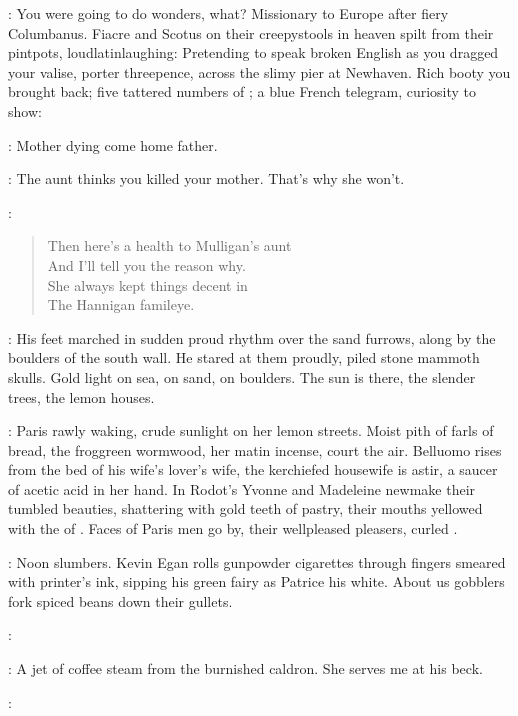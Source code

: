 \StephenInt:
You were going to do wonders, what?
Missionary to Europe after fiery Columbanus.
Fiacre and Scotus on their creepystools in heaven
spilt from their pintpots, loudlatinlaughing:
Pretending to speak broken English
as you dragged your valise, porter threepence,
across the slimy pier at Newhaven.
Rich booty you brought back;
five tattered numbers of ;
a blue French telegram, curiosity to show:

\simon:
Mother dying come home father.

\buck:
The aunt thinks you killed your mother.
That's why she won't.

:
\begin{verse}
    Then here's a health to Mulligan's aunt \\
    And I'll tell you the reason why. \\
    She always kept things decent in \\
    The Hannigan famileye.
\end{verse}

:
His feet marched in sudden proud rhythm over the sand furrows,
along by the boulders of the south wall.
He stared at them proudly,
piled stone mammoth skulls.
Gold light on sea, on sand, on boulders.
The sun is there, the slender trees, the lemon houses.

:
Paris rawly waking, crude sunlight on her lemon streets.
Moist pith of farls of bread,
the froggreen wormwood,
her matin incense,
court the air.
Belluomo rises from the bed of his wife's lover's wife,
the kerchiefed housewife is astir,
a saucer of acetic acid in her hand.
In Rodot's
Yvonne and Madeleine newmake their tumbled beauties,
shattering with gold teeth  of pastry,
their mouths yellowed with the  of .
Faces of Paris men go by, their wellpleased pleasers,
curled .

\StephenInt:
Noon slumbers.
Kevin Egan rolls gunpowder cigarettes
through fingers smeared with printer's ink,
sipping his green fairy
as Patrice his white.
About us gobblers fork spiced beans down their gullets.

\kevin:

\StephenInt:
A jet of coffee steam from the burnished caldron.
She serves me at his beck.

\kevin:

